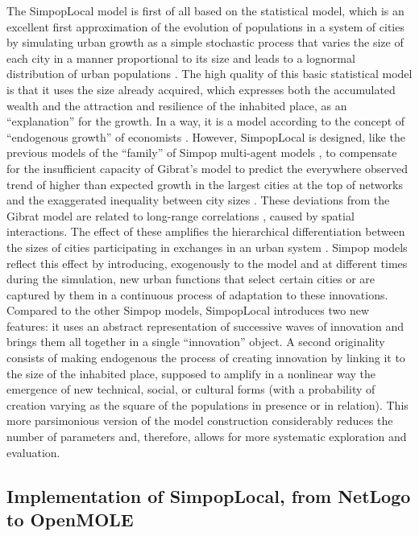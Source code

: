 \documentclass[10pt]{article}
\begin{document}
The SimpopLocal model is first of all based on the statistical model, which is an excellent first approximation of the evolution of populations in a system of cities by simulating urban growth as a simple stochastic process that varies the size of each city in a manner proportional to its size and leads to a lognormal distribution of urban populations \citep{gibrat1931inegalites}. The high quality of this basic statistical model is that it uses the size already acquired, which expresses both the accumulated wealth and the attraction and resilience of the inhabited place, as an “explanation” for the growth. In a way, it is a model according to the concept of ``endogenous growth'' of economists \citep{aghion1998endogenous}. However, SimpopLocal is designed, like the previous models of the ``family'' of Simpop multi-agent models \citep{bura1996multiagent,sanders2007artificial,pumain2008socio}, to compensate for the insufficient capacity of Gibrat’s model to predict the everywhere observed trend of higher than expected growth in the largest cities at the top of networks \citep{moriconi1993urbanisation} and the exaggerated inequality between city sizes \citep{pumain1997pour,bretagnolle2010simulating}. These deviations from the Gibrat model are related to long-range correlations \citep{rozenfeld2008laws}, caused by spatial interactions. The effect of these amplifies the hierarchical differentiation between the sizes of cities participating in exchanges in an urban system \citep{favaro2011gibrat}. Simpop models reflect this effect by introducing, exogenously to the model and at different times during the simulation, new urban functions that select certain cities or are captured by them in a continuous process of adaptation to these innovations. Compared to the other Simpop models, SimpopLocal introduces two new features: it uses an abstract representation of successive waves of innovation and brings them all together in a single ``innovation'' object. A second originality consists of making endogenous the process of creating innovation by linking it to the size of the inhabited place, supposed to amplify in a nonlinear way the emergence of new technical, social, or cultural forms (with a probability of creation varying as the square of the populations in presence or in relation). This more parsimonious version of the model construction considerably reduces the number of parameters and, therefore, allows for more systematic exploration and evaluation.


\subsection{Implementation of SimpopLocal, from NetLogo to OpenMOLE}
\end{document}
